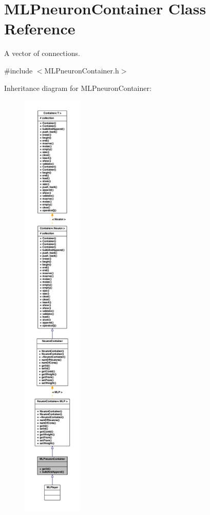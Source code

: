 \hypertarget{class_m_l_pneuron_container}{
\section{MLPneuronContainer Class Reference}
\label{class_m_l_pneuron_container}
}


A vector of connections.  




{\ttfamily \#include $<$MLPneuronContainer.h$>$}



Inheritance diagram for MLPneuronContainer:
\nopagebreak
\begin{figure}[H]
\begin{center}
\leavevmode
\includegraphics[height=600pt]{class_m_l_pneuron_container__inherit__graph}
\end{center}
\end{figure}


